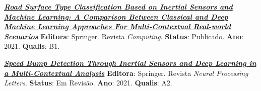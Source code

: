 \begin{small}
\begin{description}
    \item \textbf{\textit{\href{https://link.springer.com/article/10.1007/s00607-021-00914-0}{Road Surface Type Classification Based on Inertial Sensors and Machine Learning: A Comparison Between Classical and Deep Machine Learning Approaches For Multi-Contextual Real-world Scenarios}}} \phantom{ } 
    \newline\textbf{Editora}: Springer. Revista \textit{Computing}.  
    \newline\textbf{Status}: Publicado.
    \newline\textbf{Ano}: 2021.
    \newline\textbf{Qualis}: B1.
    
    \item \textbf{\textit{\href{}{Speed Bump Detection Through Inertial Sensors and Deep Learning in a Multi-Contextual Analysis}}}\phantom{ } 
    \newline\textbf{Editora}: Springer. Revista \textit{Neural Processing Letters}.  
    \newline\textbf{Status}: Em Revisão.
    \newline\textbf{Ano}: 2021.
    \newline\textbf{Qualis}: A2.

\end{description}
\end{small}